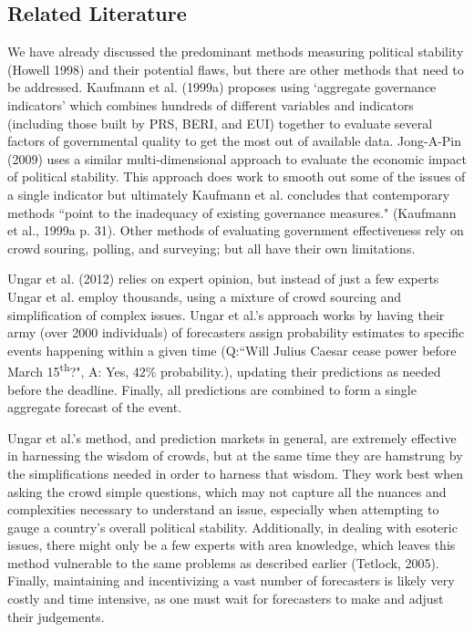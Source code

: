 \documentclass[12pt]{article}
\begin{document}
\begin{spacing}{1.5}
\section*{Related Literature}   

We have already discussed the predominant methods measuring political stability (Howell 1998) and their potential flaws, but there are other methods that need to be addressed. Kaufmann et al. (1999a) proposes using `aggregate governance indicators' which combines hundreds of different variables and indicators (including those built by PRS, BERI, and EUI) together to evaluate several factors of governmental quality to get the most out of available data. Jong-A-Pin (2009) uses a similar multi-dimensional approach to evaluate the economic impact of political stability. This approach does work to smooth out some of the issues of a single indicator but ultimately Kaufmann et al. concludes that contemporary methods ``point to the inadequacy of existing governance measures." (Kaufmann et al., 1999a p. 31). Other methods of evaluating government effectiveness rely on crowd souring, polling, and surveying; but all have their own limitations. 

Ungar et al. (2012) relies on expert opinion, but instead of just a few experts Ungar et al. employ thousands, using a mixture of crowd sourcing and simplification of complex issues. Ungar et al.'s approach works by having their army (over 2000 individuals) of forecasters assign probability estimates to specific events happening within a given time (Q:``Will Julius Caesar cease power before March 15\textsuperscript{th}?", A: Yes, 42\% probability.), updating their predictions as needed before the deadline. Finally, all predictions are combined to form a single aggregate forecast of the event. 

Ungar et al.'s method, and prediction markets in general, are extremely effective in harnessing the wisdom of crowds, but at the same time they are hamstrung by the simplifications needed in order to harness that wisdom. They work best when asking the crowd simple questions, which may not capture all the nuances and complexities necessary to understand an issue, especially when attempting to gauge a country's overall political stability. Additionally, in dealing with esoteric issues, there might only be a few experts with area knowledge, which leaves this method vulnerable to the same problems as described earlier (Tetlock, 2005). Finally, maintaining and incentivizing a vast number of forecasters is likely very costly and time intensive, as one must wait for forecasters to make and adjust their judgements. 


\end{spacing}
\end{document}
